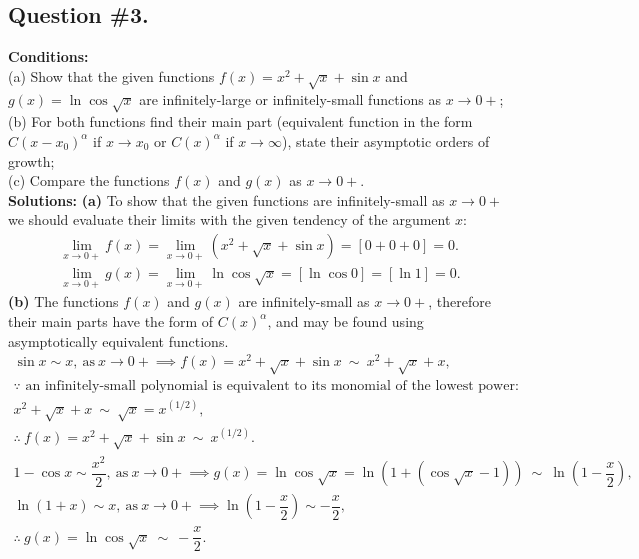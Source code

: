 \subsection*{\center Question \#3.}
{\bf Conditions:}\\
(a) Show that the given functions $f(x)=x^2+\sqrt{x}+\sin{x}$ and $g(x)=\ln{\cos{\sqrt{x}}}$ are infinitely-large or infinitely-small functions as $x\rightarrow0+$;\\
(b) For both functions find their main part (equivalent function in the form $C(x-x_0)^\alpha$ if $x\rightarrow x_0$ or $C(x)^\alpha$ if $x\rightarrow\infty$), state their asymptotic orders of growth;\\
(c) Compare the functions $f(x)$ and $g(x)$ as $x\rightarrow0+$.\\ [0.5cm]
{\bf Solutions:}
{\bf\flushleft (a)}
To show that the given functions are infinitely-small as $x\rightarrow0+$ we should evaluate their limits with the given tendency of the argument $x$:
$$
\begin{array}{c}
\lim\limits_{x\rightarrow0+}f(x) = 
\lim\limits_{x\rightarrow0+}(x^2+\sqrt{x}+\sin{x}) =
\left[0+0+0\right] = 0. \\ [13pt]
\lim\limits_{x\rightarrow0+}g(x) = 
\lim\limits_{x\rightarrow0+}\ln{\cos{\sqrt{x}}} =
\left[\ln{\cos{0}}\right] = 
\left[\ln{1}\right] = 0.
\end{array}
$$
\newpage
{\bf\flushleft (b)}
The functions $f(x)$ and $g(x)$ are infinitely-small as $x\rightarrow0+$, therefore their main parts have the form of $C(x)^\alpha$, and may be found using asymptotically equivalent functions.
$$
\begin{array}{c}
\sin{x}\sim x,\ \text{as}\ x\rightarrow{0+} \implies
f(x)=x^2+\sqrt{x}+\sin{x}\ \sim\ x^2+\sqrt{x}+x, \\
\because \text{ an infinitely-small polynomial is equivalent to its monomial of the lowest power:} \\
x^2+\sqrt{x}+x\ \sim\ \sqrt{x}=x^{(1/2)}, \\
\therefore\ f(x)=x^2+\sqrt{x}+\sin{x}\ \sim\ x^{(1/2)}.\\ [0.4cm]
1-\cos{x}\sim \dfrac{x^2}{2},\ \text{as}\ x\rightarrow{0+} \implies
g(x)=\ln{\cos{\sqrt{x}}}=\ln{(1+(\cos{\sqrt{x}}-1))}\ \sim\ \ln{(1-\dfrac{x}{2})},\\
\ln{(1+x)}\sim x,\ \text{as}\ x\rightarrow{0+} \implies
\ln{(1-\dfrac{x}{2})}\sim -\dfrac{x}{2}, \\
\therefore\ g(x)=\ln{\cos{\sqrt{x}}}\ \sim\ -\dfrac{x}{2}.
\end{array}
$$
